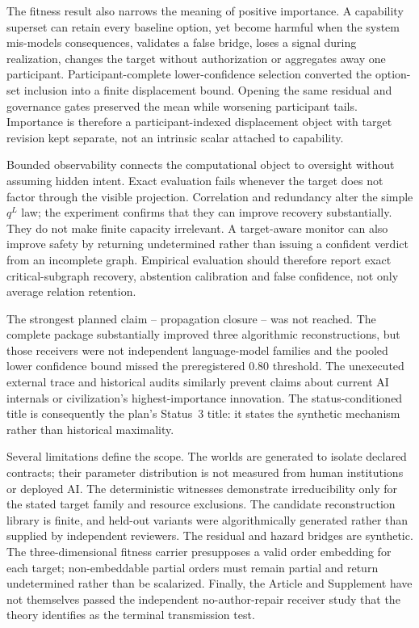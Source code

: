 \documentclass[10pt]{article}
\begin{document}
The fitness result also narrows the meaning of positive importance. A capability superset can retain every baseline option, yet become harmful when the system mis-models consequences, validates a false bridge, loses a signal during realization, changes the target without authorization or aggregates away one participant. Participant-complete lower-confidence selection converted the option-set inclusion into a finite displacement bound. Opening the same residual and governance gates preserved the mean while worsening participant tails. Importance is therefore a participant-indexed displacement object with target revision kept separate, not an intrinsic scalar attached to capability.

Bounded observability connects the computational object to oversight without assuming hidden intent. Exact evaluation fails whenever the target does not factor through the visible projection. Correlation and redundancy alter the simple $q^L$ law; the experiment confirms that they can improve recovery substantially. They do not make finite capacity irrelevant. A target-aware monitor can also improve safety by returning undetermined rather than issuing a confident verdict from an incomplete graph. Empirical evaluation should therefore report exact critical-subgraph recovery, abstention calibration and false confidence, not only average relation retention.

The strongest planned claim -- propagation closure -- was not reached. The complete package substantially improved three algorithmic reconstructions, but those receivers were not independent language-model families and the pooled lower confidence bound missed the preregistered 0.80 threshold. The unexecuted external trace and historical audits similarly prevent claims about current AI internals or civilization's highest-importance innovation. The status-conditioned title is consequently the plan's Status~3 title: it states the synthetic mechanism rather than historical maximality.

Several limitations define the scope. The worlds are generated to isolate declared contracts; their parameter distribution is not measured from human institutions or deployed AI. The deterministic witnesses demonstrate irreducibility only for the stated target family and resource exclusions. The candidate reconstruction library is finite, and held-out variants were algorithmically generated rather than supplied by independent reviewers. The residual and hazard bridges are synthetic. The three-dimensional fitness carrier presupposes a valid order embedding for each target; non-embeddable partial orders must remain partial and return undetermined rather than be scalarized. Finally, the Article and Supplement have not themselves passed the independent no-author-repair receiver study that the theory identifies as the terminal transmission test.
\end{document}
